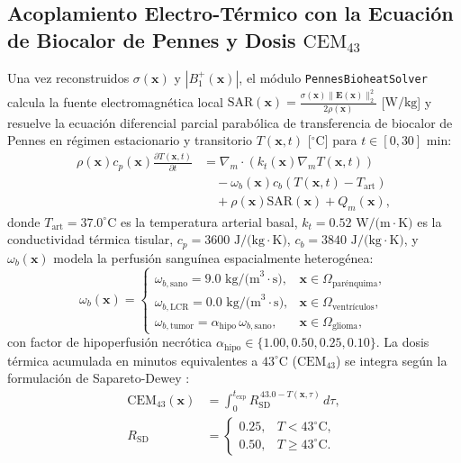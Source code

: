 \documentclass[10pt,journal,compsoc]{IEEEtran}
\begin{document}
\subsection{\texorpdfstring{Acoplamiento Electro-Térmico con la Ecuación de Biocalor de Pennes y Dosis $\text{CEM}_{43}$}{Acoplamiento Electro-Térmico con la Ecuación de Biocalor de Pennes y Dosis CEM43}}
Una vez reconstruidos $\sigma(\mathbf{x})$ y $|B_1^+(\mathbf{x})|$, el módulo \texttt{PennesBioheatSolver} calcula la fuente electromagnética local $\text{SAR}(\mathbf{x}) = \frac{\sigma(\mathbf{x})\|\mathbf{E}(\mathbf{x})\|_2^2}{2\rho(\mathbf{x})}$ [$\text{W/kg}$] y resuelve la ecuación diferencial parcial parabólica de transferencia de biocalor de Pennes \cite{pennes1948analysis} en régimen estacionario y transitorio $T(\mathbf{x},t)$ [$^\circ\text{C}$] para $t \in [0, 30]\text{ min}$:
\begin{equation}
\begin{aligned}
\rho(\mathbf{x}) c_p(\mathbf{x}) \frac{\partial T(\mathbf{x}, t)}{\partial t} &= \nabla_m \cdot \left( k_t(\mathbf{x}) \nabla_m T(\mathbf{x}, t) \right) \\
&\quad - \omega_b(\mathbf{x}) c_b \left( T(\mathbf{x}, t) - T_{\text{art}} \right) \\
&\quad + \rho(\mathbf{x}) \text{SAR}(\mathbf{x}) + Q_m(\mathbf{x}),
\end{aligned}
\label{eq:pennes}
\end{equation}
donde $T_{\text{art}} = 37.0^\circ\text{C}$ es la temperatura arterial basal, $k_t = 0.52\text{ W/(m}\cdot\text{K)}$ es la conductividad térmica tisular, $c_p = 3600\text{ J/(kg}\cdot\text{K)}$, $c_b = 3840\text{ J/(kg}\cdot\text{K)}$, y $\omega_b(\mathbf{x})$ modela la perfusión sanguínea espacialmente heterogénea:
\begin{equation}
\omega_b(\mathbf{x}) = \begin{cases}
\omega_{b,\text{sano}} = 9.0\text{ kg/(m}^3\cdot\text{s)}, & \mathbf{x} \in \Omega_{\text{parénquima}}, \\
\omega_{b,\text{LCR}} = 0.0\text{ kg/(m}^3\cdot\text{s)}, & \mathbf{x} \in \Omega_{\text{ventrículos}}, \\
\omega_{b,\text{tumor}} = \alpha_{\text{hipo}}\,\omega_{b,\text{sano}}, & \mathbf{x} \in \Omega_{\text{glioma}},
\end{cases}
\end{equation}
con factor de hipoperfusión necrótica $\alpha_{\text{hipo}} \in \{1.00, 0.50, 0.25, 0.10\}$. La dosis térmica acumulada en minutos equivalentes a $43^\circ\text{C}$ ($\text{CEM}_{43}$) se integra según la formulación de Sapareto-Dewey \cite{sapareto1984thermal}:
\begin{equation}
\begin{aligned}
\text{CEM}_{43}(\mathbf{x}) &= \int_0^{t_{\text{exp}}} R_{\text{SD}}^{\,43.0 - T(\mathbf{x}, \tau)} \, d\tau, \\
R_{\text{SD}} &= \begin{cases} 0.25, & T < 43^\circ\text{C}, \\ 0.50, & T \ge 43^\circ\text{C}. \end{cases}
\end{aligned}
\end{equation}
\end{document}
